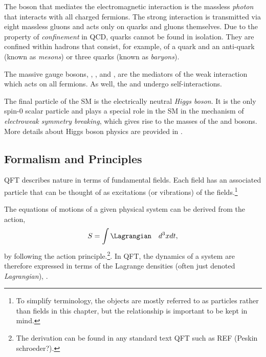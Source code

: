 The boson that mediates the electromagnetic interaction is the massless \emph{photon} that interacts with all charged fermions.
The strong interaction is transmitted via eight massless gluons and acts only on quarks and gluons themselves.
Due to the property of \emph{confinement} in QCD, quarks cannot be found in isolation. They are confined within hadrons that consist, for example, of a quark and an anti-quark (known as \emph{mesons}) or three quarks (known as \emph{baryons}).

The massive gauge bosons, \Wplus, \Wminus, and \Zboson, are the mediators of the weak interaction which acts on all fermions. As well, the \Wmp and \Zboson undergo self-interactions.

The final particle of the SM is the electrically neutral \emph{Higgs boson}. It is the only spin-0 scalar particle and plays a special role in the SM in the mechanism of \emph{electroweak symmetry breaking}, which gives rise to the masses of the \Wpm and \Zboson bosons. More details about Higgs boson physics are provided in .


\subsection{Formalism and Principles}

QFT describes nature in terms of fundamental fields. Each field has an associated particle that can be thought of as excitations (or vibrations) of the fields.\footnote{To simplify terminology, the objects are mostly referred to as particles rather than fields in this chapter, but the relationship is important to be kept in mind.}

The equations of motions of a given physical system can be derived from the action,
\begin{equation}
  \label{eq:action}
  S = \int \Lagrangian \quad d^3x dt,
\end{equation}
by following the action principle.\footnote{The derivation can be found in any standard text QFT such as REF (Peskin schroeder?).}.
In QFT, the dynamics of a system are therefore expressed in terms of the Lagrange densities (often just denoted \emph{Lagrangian}), \Lagrangian. 

